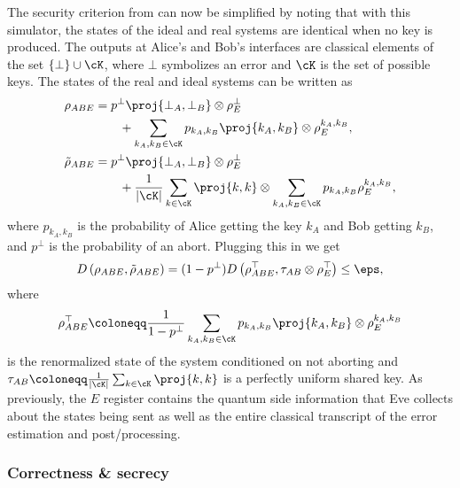 The security criterion from  can now be simplified by noting that with this simulator, the states of the ideal and real systems are identical when no key is produced. The outputs at Alice's and Bob's interfaces are classical elements of the set $\{\bot\} \cup \cK$, where $\bot$ symbolizes an error and $\cK$ is the set of possible keys. The states of the real and ideal systems can be written as
\begin{align*}  \rho_{ABE} & = p^\bot \proj{\bot_A,\bot_B} \otimes
  \rho^\bot_E \\
  & \qquad + \sum_{k_A,k_B \in \cK} p_{k_A,k_B} \proj{k_A,k_B} \otimes
  \rho^{k_A,k_B}_E,\\
  \tilde{\rho}_{ABE} & = p^\bot \proj{\bot_A,\bot_B}
  \otimes \rho^\bot_E \\ & \qquad +\frac{1}{|\cK|} \sum_{k \in \cK} \proj{k,k}
  \otimes \sum_{k_A,k_B \in \cK} p_{k_A,k_B} \rho^{k_A,k_B}_E,
\end{align*}
where $p_{k_A,k_B}$ is the probability of Alice getting the key $k_A$
and Bob getting $k_B$, and $p^\bot$ is the probability of an abort.
Plugging this in  we get
\begin{equation} \label{eq:qkd.security.2} D\left(
    \rho_{ABE},\tilde{\rho}_{ABE}\right) = (1- p^{\bot})
  D\left(\rho^{\top}_{ABE},\tau_{AB} \otimes \rho^{\top}_{E}\right)
  \leq \eps, 
  \end{equation}
where
 \begin{equation} \label{eq:qkd.security.tmp} \rho^{\top}_{ABE}
  \coloneqq \frac{1}{1- p^{\bot}} \sum_{k_A,k_B \in \cK} p_{k_A,k_B}
  \proj{k_A,k_B} \otimes \rho^{k_A,k_B}_E 
\end{equation}
is the renormalized state of the system conditioned on not aborting
and $\tau_{AB} \coloneqq \frac{1}{|\cK|} \sum_{k \in \cK} \proj{k,k}$
is a perfectly uniform shared key. As previously, the $E$ register
contains the quantum side information that Eve collects about the
states being sent as well as the entire classical transcript of the
error estimation and post\-/processing.

\subsubsection{Correctness \& secrecy}
\label{sec:security.simple}

